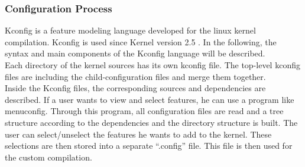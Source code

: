 \documentclass{sig-alternate-05-2015}
\begin{document}
\subsubsection{Configuration Process}
Kconfig is a feature modeling language developed for the linux kernel compilation. Kconfig is used since Kernel version 2.5 \cite{mauerer2010professional}. In the following, the syntax and main components of the Kconfig language will be described.\\ Each directory of the kernel sources has its own kconfig file. The top-level kconfig files are including the child-configuration files and merge them together.\\ Inside the Kconfig files, the corresponding sources and dependencies are described. If a user wants to view and select features, he can use a program like menuconfig. Through this program, all configuration files are read and a tree structure according to the dependencies and the directory structure is built. The user can select/unselect the features he wants to add to the kernel. These selections are then stored into a separate ``.config'' file. This file is then used for the custom compilation.\par 
\end{document}

